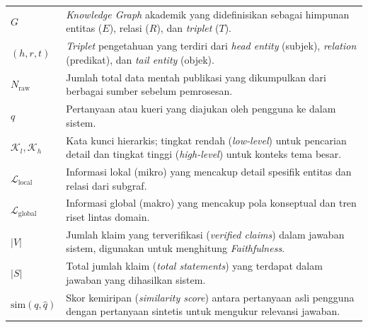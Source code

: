 \documentclass{ProposalUnesa}
\begin{document}


\Awal

\HalamanJudul

\HalamanPersetujuan
\HalamanLembarRevisi

\DaftarIsi
\DaftarTabel
\DaftarGambar
\DaftarSimbol
\renewcommand{\arraystretch}{1.5}
\begin{longtable}{p{} p{}}
	$G$                            & \textit{Knowledge Graph} akademik yang didefinisikan sebagai himpunan entitas ($E$), relasi ($R$), dan \textit{triplet} ($T$).                      \\
	$(h, r, t)$                    & \textit{Triplet} pengetahuan yang terdiri dari \textit{head entity} (subjek), \textit{relation} (predikat), dan \textit{tail entity} (objek).       \\
	$N_{\text{raw}}$               & Jumlah total data mentah publikasi yang dikumpulkan dari berbagai sumber sebelum pemrosesan.                                                        \\

	$q$                            & Pertanyaan atau kueri yang diajukan oleh pengguna ke dalam sistem.                                                                                  \\
	$\mathcal{K}_l, \mathcal{K}_h$ & Kata kunci hierarkis; tingkat rendah (\textit{low-level}) untuk pencarian detail dan tingkat tinggi (\textit{high-level}) untuk konteks tema besar. \\
	$\mathcal{L}_{\text{local}}$   & Informasi lokal (mikro) yang mencakup detail spesifik entitas dan relasi dari subgraf.                                                              \\
	$\mathcal{L}_{\text{global}}$  & Informasi global (makro) yang mencakup pola konseptual dan tren riset lintas domain.                                                                \\

	$|V|$                          & Jumlah klaim yang terverifikasi (\textit{verified claims}) dalam jawaban sistem, digunakan untuk menghitung \textit{Faithfulness}.                  \\
	$|S|$                          & Total jumlah klaim (\textit{total statements}) yang terdapat dalam jawaban yang dihasilkan sistem.                                                  \\
	$\text{sim}(q, \hat{q})$       & Skor kemiripan (\textit{similarity score}) antara pertanyaan asli pengguna dengan pertanyaan sintetis untuk mengukur relevansi jawaban.             \\
\end{longtable}

\Inti







\nocite{*}

\Glosarium
\BukaLampiran

\end{document}
